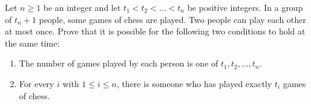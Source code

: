Let $n\geq1$ be an integer and let $t_1<t_2<\dots<t_n$ be positive integers. In a group of $t_n+1$ people, some games of chess are played. Two people can play each other at most once. Prove that it is possible for the following two conditions to hold at the same time: 

\begin{enumerate}[label=(\roman*)]
	\item The number of games played by each person is one of $t_1,t_2,\dots,t_n$.
	\item For every $i$ with $1\leq i\leq n$, there is someone who has played exactly $t_i$ games of chess.
\end{enumerate}